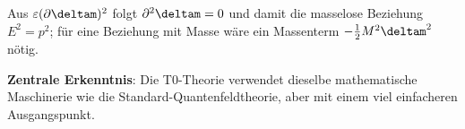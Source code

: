 	\begin{table}[htbp]
		\centering
		\caption{Verbindung zur Standard-Feldtheorie}
		\label{tab:standard_connection}
	\end{table}
	Aus $\varepsilon(\partial\deltam)^2$ folgt $\partial^2\deltam = 0$ und damit die masselose Beziehung $E^2 = p^2$; für eine Beziehung mit Masse wäre ein Massenterm $-\tfrac12 M^2\deltam^2$ nötig.
	
	\textbf{Zentrale Erkenntnis}: Die T0-Theorie verwendet dieselbe mathematische Maschinerie wie die Standard-Quantenfeldtheorie, aber mit einem viel einfacheren Ausgangspunkt.


